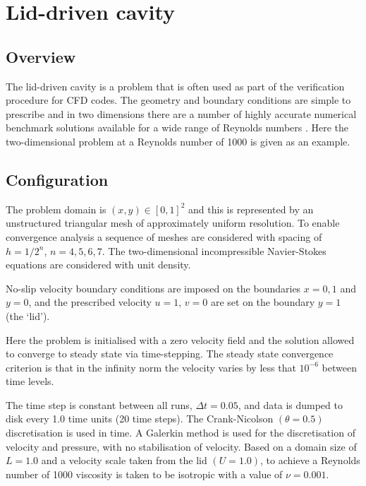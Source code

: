 
\section{Lid-driven cavity}
\label{sec:lid_driven_cavity}

\subsection{Overview}
The lid-driven cavity is a problem that is often used as part of the verification procedure for
CFD codes. The geometry and boundary conditions are simple to prescribe and in
two dimensions there are a number of highly accurate numerical benchmark solutions
available for a wide range of Reynolds numbers \citep{botella1998,erturk2005,bruneau2006}.
Here the two-dimensional problem at a Reynolds number of 1000 is given as an example.

\subsection{Configuration}
The problem domain is $(x,y) \in [0,1]^2$ and this is represented by an unstructured triangular mesh
of approximately uniform resolution. To enable convergence analysis a sequence of meshes are considered
with spacing of $h=1/2^n$, $n=4,5,6,7$. The two-dimensional incompressible Navier-Stokes equations are
considered with unit density.

No-slip velocity boundary conditions are imposed on the boundaries $x=0,1$ and $y=0$,
and the prescribed velocity $u=1$, $v=0$ are set on the boundary $y=1$ (the `lid').

Here the problem is initialised with a zero velocity field and the solution
allowed to converge to steady state via time-stepping. The steady state convergence criterion is
that in the infinity norm the velocity varies by less that $10^{-6}$ between time levels.

The time step is constant between all runs, $\Delta t = 0.05$, and data is dumped to disk every
1.0 time units (20 time steps). The Crank-Nicolson $(\theta=0.5)$ discretisation is used in time.
A \Poo Galerkin method is used for the discretisation of velocity and pressure, with no stabilisation
of velocity. Based on a domain size of $L=1.0$ and a velocity scale taken from the lid $(U=1.0)$, to achieve
a Reynolds number of 1000 viscosity is taken to be isotropic with a value of $\nu=0.001$.



